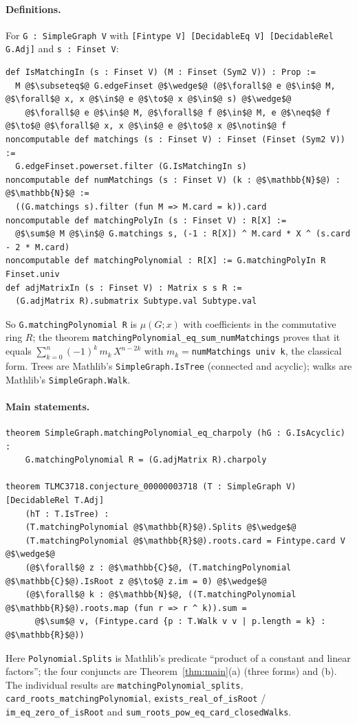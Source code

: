 \documentclass[11pt,a4paper]{article}
\theoremstyle{definition}
\theoremstyle{remark}
\begin{document}
\paragraph{Definitions.} For \texttt{G : SimpleGraph V} with \texttt{[Fintype V] [DecidableEq V]
[DecidableRel G.Adj]} and \texttt{s : Finset V}:
\begin{lstlisting}
def IsMatchingIn (s : Finset V) (M : Finset (Sym2 V)) : Prop :=
  M @$\subseteq$@ G.edgeFinset @$\wedge$@ (@$\forall$@ e @$\in$@ M, @$\forall$@ x, x @$\in$@ e @$\to$@ x @$\in$@ s) @$\wedge$@
    @$\forall$@ e @$\in$@ M, @$\forall$@ f @$\in$@ M, e @$\neq$@ f @$\to$@ @$\forall$@ x, x @$\in$@ e @$\to$@ x @$\notin$@ f
noncomputable def matchings (s : Finset V) : Finset (Finset (Sym2 V)) :=
  G.edgeFinset.powerset.filter (G.IsMatchingIn s)
noncomputable def numMatchings (s : Finset V) (k : @$\mathbb{N}$@) : @$\mathbb{N}$@ :=
  ((G.matchings s).filter (fun M => M.card = k)).card
noncomputable def matchingPolyIn (s : Finset V) : R[X] :=
  @$\sum$@ M @$\in$@ G.matchings s, (-1 : R[X]) ^ M.card * X ^ (s.card - 2 * M.card)
noncomputable def matchingPolynomial : R[X] := G.matchingPolyIn R Finset.univ
def adjMatrixIn (s : Finset V) : Matrix s s R :=
  (G.adjMatrix R).submatrix Subtype.val Subtype.val
\end{lstlisting}
So \texttt{G.matchingPolynomial R} is $\mu(G;x)$ with coefficients in the commutative ring $R$;
the theorem \newline \texttt{matchingPolynomial\_eq\_sum\_numMatchings} proves that it equals
$\sum_{k=0}^{n}(-1)^k\,m_k\,X^{n-2k}$ with $m_k=$\texttt{numMatchings univ k}, the classical form.
Trees are Mathlib's \texttt{SimpleGraph.IsTree} (connected and acyclic); walks are Mathlib's
\texttt{SimpleGraph.Walk}.

\paragraph{Main statements.}
\begin{lstlisting}
theorem SimpleGraph.matchingPolynomial_eq_charpoly (hG : G.IsAcyclic) :
    G.matchingPolynomial R = (G.adjMatrix R).charpoly

theorem TLMC3718.conjecture_00000003718 (T : SimpleGraph V) [DecidableRel T.Adj]
    (hT : T.IsTree) :
    (T.matchingPolynomial @$\mathbb{R}$@).Splits @$\wedge$@
    (T.matchingPolynomial @$\mathbb{R}$@).roots.card = Fintype.card V @$\wedge$@
    (@$\forall$@ z : @$\mathbb{C}$@, (T.matchingPolynomial @$\mathbb{C}$@).IsRoot z @$\to$@ z.im = 0) @$\wedge$@
    (@$\forall$@ k : @$\mathbb{N}$@, ((T.matchingPolynomial @$\mathbb{R}$@).roots.map (fun r => r ^ k)).sum =
      @$\sum$@ v, (Fintype.card {p : T.Walk v v | p.length = k} : @$\mathbb{R}$@))
\end{lstlisting}
Here \texttt{Polynomial.Splits} is Mathlib's predicate ``product of a constant and linear
factors''; the four conjuncts are Theorem~\ref{thm:main}(a) (three forms) and (b). The individual
results are \texttt{matchingPolynomial\_splits}, \texttt{card\_roots\_matchingPolynomial},
\texttt{exists\_real\_of\_isRoot} / \texttt{im\_eq\_zero\_of\_isRoot} and
\texttt{sum\_roots\_pow\_eq\_card\_closedWalks}.
\end{document}
